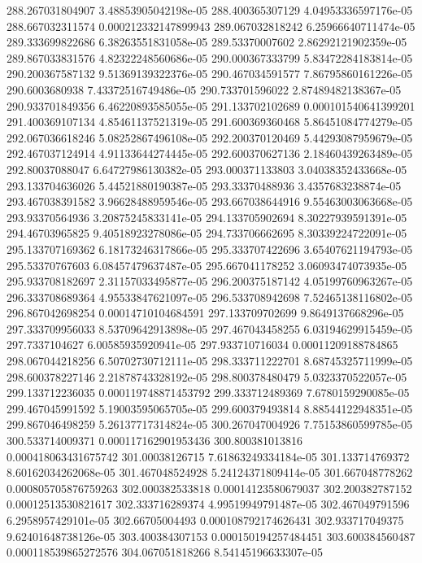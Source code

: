 {288.267031804907 3.48853905042198e-05
288.400365307129 4.04953336597176e-05
288.667032311574 0.000212332147899943
289.067032818242 6.25966640711474e-05
289.333699822686 6.38263551831058e-05
289.53370007602 2.86292121902359e-05
289.867033831576 4.82322248560686e-05
290.000367333799 5.83472284183814e-05
290.200367587132 9.51369139322376e-05
290.467034591577 7.86795860161226e-05
290.6003680938 7.43372516749486e-05
290.733701596022 2.87489482138367e-05
290.933701849356 6.46220893585055e-05
291.133702102689 0.000101540641399201
291.400369107134 4.85461137521319e-05
291.600369360468 5.86451084774279e-05
292.067036618246 5.08252867496108e-05
292.200370120469 5.44293087959679e-05
292.467037124914 4.91133644274445e-05
292.600370627136 2.18460439263489e-05
292.80037088047 6.64727986130382e-05
293.000371133803 3.04038352433668e-05
293.133704636026 5.44521880190387e-05
293.33370488936 3.4357683238874e-05
293.467038391582 3.96628488959546e-05
293.667038644916 9.55463003063668e-05
293.93370564936 3.20875245833141e-05
294.133705902694 8.30227939591391e-05
294.46703965825 9.40518923278086e-05
294.733706662695 8.30339224722091e-05
295.133707169362 6.18173246317866e-05
295.333707422696 3.65407621194793e-05
295.53370767603 6.08457479637487e-05
295.667041178252 3.06093474073935e-05
295.933708182697 2.31157033495877e-05
296.200375187142 4.05199760963267e-05
296.333708689364 4.95533847621097e-05
296.533708942698 7.52465138116802e-05
296.867042698254 0.00014710104684591
297.133709702699 9.8649137668296e-05
297.333709956033 8.53709642913898e-05
297.467043458255 6.03194629915459e-05
297.7337104627 6.00585935920941e-05
297.933710716034 0.00011209188784865
298.067044218256 6.50702730712111e-05
298.333711222701 8.68745325711999e-05
298.600378227146 2.21878743328192e-05
298.800378480479 5.0323370522057e-05
299.133712236035 0.000119748871453792
299.333712489369 7.6780159290085e-05
299.467045991592 5.19003595065705e-05
299.600379493814 8.88544122948351e-05
299.867046498259 5.26137717314824e-05
300.267047004926 7.75153860599785e-05
300.533714009371 0.000117162901953436
300.800381013816 0.000418063431675742
301.00038126715 7.61863249334184e-05
301.133714769372 8.60162034262068e-05
301.467048524928 5.24124371809414e-05
301.667048778262 0.000805705876759263
302.000382533818 0.00014123580679037
302.200382787152 0.00012513530821617
302.333716289374 4.99519949791487e-05
302.467049791596 6.2958957429101e-05
302.66705004493 0.000108792174626431
302.933717049375 9.62401648738126e-05
303.400384307153 0.000150194257484451
303.600384560487 0.000118539865272576
304.067051818266 8.54145196633307e-05
}
